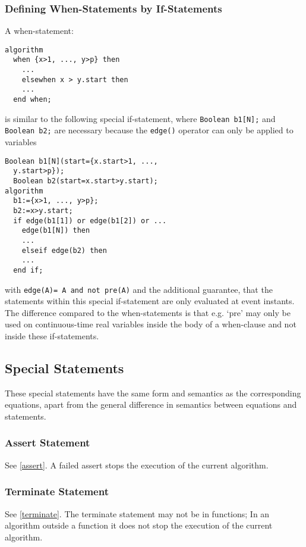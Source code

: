 \subsubsection{Defining When-Statements by If-Statements}

A when-statement:

\begin{lstlisting}[language=modelica]
algorithm
  when {x>1, ..., y>p} then
    ...
    elsewhen x > y.start then
    ...
  end when;
\end{lstlisting}
is similar to the following special if-statement, where \lstinline!Boolean b1[N];! and \lstinline!Boolean b2;! are necessary because the \lstinline!edge()! operator can
only be applied to variables

\begin{lstlisting}[language=modelica]
  Boolean b1[N](start={x.start>1, ...,
  y.start>p});
  Boolean b2(start=x.start>y.start);
algorithm
  b1:={x>1, ..., y>p};
  b2:=x>y.start;
  if edge(b1[1]) or edge(b1[2]) or ...
    edge(b1[N]) then
    ...
    elseif edge(b2) then
    ...
  end if;
\end{lstlisting}
  with \lstinline!edge(A)= A and not pre(A)! and the additional guarantee, that the
  statements within this special if-statement are only evaluated at event
  instants. The difference compared to the when-statements is that e.g.
`pre' may only be used on continuous-time real variables inside the body
of a when-clause and not inside these if-statements.

\subsection{Special Statements}

These special statements have the same form and semantics as the
corresponding equations, apart from the general difference in semantics
between equations and statements.

\subsubsection{Assert Statement}

See \autoref{assert}. A failed assert stops the execution of the current
algorithm.

\subsubsection{Terminate Statement}

See \autoref{terminate}. The terminate statement may not be in functions; In
an algorithm outside a function it does not stop the execution of the
current algorithm.
